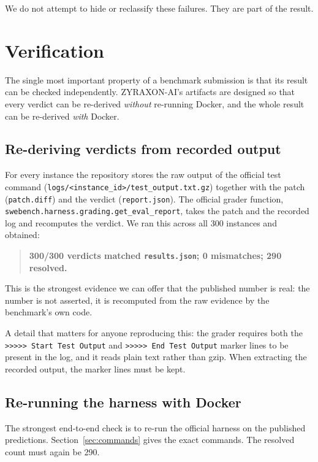 \documentclass[11pt,a4paper]{article}
\begin{document}
We do not attempt to hide or reclassify these failures. They are part of the result.

\section{Verification}
\label{sec:verify}

The single most important property of a benchmark submission is that its result can be
checked independently. ZYRAXON-AI's artifacts are designed so that every verdict can be
re-derived \emph{without} re-running Docker, and the whole result can be re-derived
\emph{with} Docker.

\subsection{Re-deriving verdicts from recorded output}

For every instance the repository stores the raw output of the official test command
(\texttt{logs/<instance\_id>/test\_output.txt.gz}) together with the patch
(\texttt{patch.diff}) and the verdict (\texttt{report.json}). The official grader
function, \texttt{swebench.harness.grading.get\_eval\_report}, takes the patch and the
recorded log and recomputes the verdict. We ran this across all 300 instances and
obtained:

\begin{quote}
\textbf{300/300 verdicts matched \texttt{results.json}; 0 mismatches; 290 resolved.}
\end{quote}

This is the strongest evidence we can offer that the published number is real: the number
is not asserted, it is recomputed from the raw evidence by the benchmark's own code.

A detail that matters for anyone reproducing this: the grader requires both the
\texttt{>>>>> Start Test Output} and \texttt{>>>>> End Test Output} marker lines to be
present in the log, and it reads plain text rather than gzip. When extracting the
recorded output, the marker lines must be kept.

\subsection{Re-running the harness with Docker}

The strongest end-to-end check is to re-run the official harness on the published
predictions. Section~\ref{sec:commands} gives the exact commands. The resolved count must
again be 290.
\end{document}
